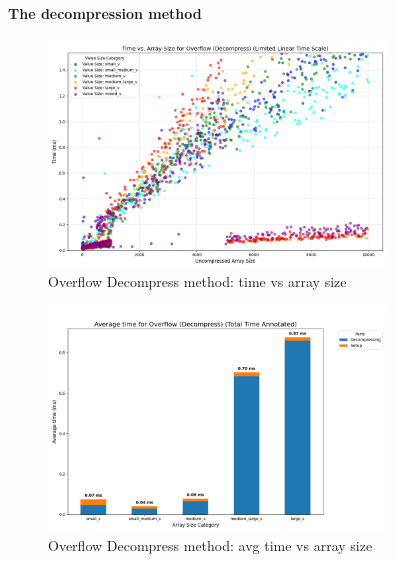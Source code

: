 \documentclass[11pt, a4paper]{article}
\begin{document}
	\paragraph{The decompression method}
	\begin{figure}[H]%
		\centering
		\includegraphics[width=0.8\textwidth]{Grafics/Overflow/OverflowDecompressTimevsSize.png}
		\caption{Overflow Decompress method: time vs array size}
		\label{fig:26}
		
	\end{figure}
	\begin{figure}[H]%
		\centering
		\includegraphics[width=0.8\textwidth]{Grafics/Overflow/OverflowDecompressTime.png}
		\caption{Overflow Decompress method: avg time vs array size}
		\label{fig:27}
	\end{figure}
	
\end{document}
